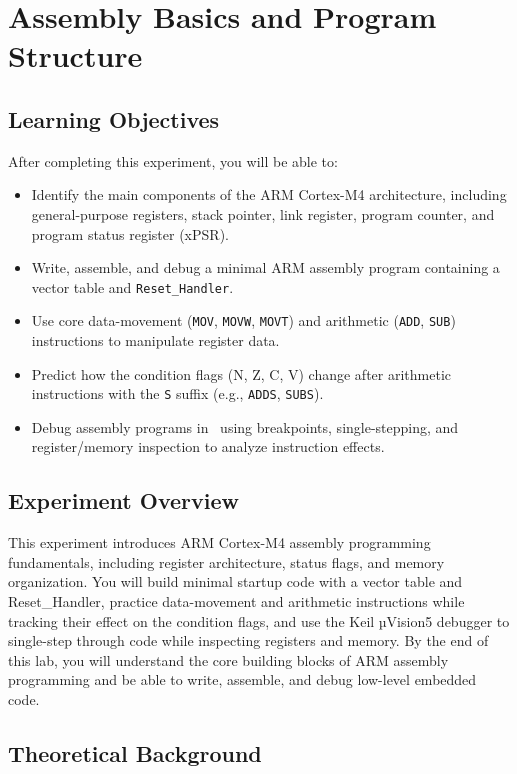\chapter{Assembly Basics and Program Structure}
\section*{Learning Objectives}
After completing this experiment, you will be able to:
\begin{itemize}[nosep]
  \item Identify the main components of the ARM Cortex-M4 architecture, including general-purpose registers, stack pointer, link register, program counter, and program status register (xPSR).
  \item Write, assemble, and debug a minimal ARM assembly program containing a vector table and \texttt{Reset\_Handler}.
  \item Use core data-movement (\texttt{MOV}, \texttt{MOVW}, \texttt{MOVT}) and arithmetic (\texttt{ADD}, \texttt{SUB}) instructions to manipulate register data.
  \item Predict how the condition flags (N, Z, C, V) change after arithmetic instructions with the \texttt{S} suffix (e.g., \texttt{ADDS}, \texttt{SUBS}).
  \item Debug assembly programs in \keil\ using breakpoints, single-stepping, and register/memory inspection to analyze instruction effects.
\end{itemize}

\section*{Experiment Overview}
This experiment introduces ARM Cortex-M4 assembly programming fundamentals, including register architecture, status flags, and memory organization. You will build minimal startup code with a vector table and Reset\_Handler, practice data-movement and arithmetic instructions while tracking their effect on the condition flags, and use the Keil µVision5 debugger to single-step through code while inspecting registers and memory. By the end of this lab, you will understand the core building blocks of ARM assembly programming and be able to write, assemble, and debug low-level embedded code.

\newpage
\section{Theoretical Background}
